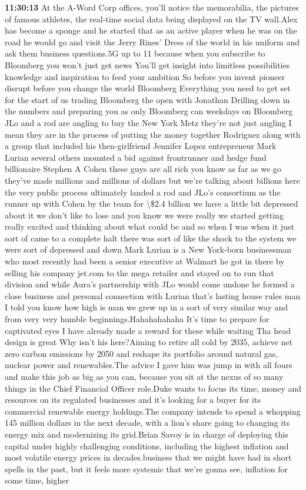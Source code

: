 \documentclass{article}%
\begin{document}
\textbf{11:30:13}%
\newline%
At the A{-}Word Corp offices, you'll notice the memorabilia, the pictures of famous athletes, the real{-}time social data being displayed on the TV wall.Alex has become a sponge and he started that as an active player when he was on the road he would go and visit the Jerry Rines' Dress of the world in his uniform and ask them business questions.5G up to 11 because when you subscribe to Bloomberg you won't just get news You'll get insight into limitless possibilities knowledge and inspiration to feed your ambition So before you invent pioneer disrupt before you change the world Bloomberg Everything you need to get set for the start of us trading Bloomberg the open with Jonathan Drilling down in the numbers and preparing you as only Bloomberg can weekdays on Bloomberg JLo and a rod are angling to buy the New York Metz they're not just angling I mean they are in the process of putting the money together Rodriguez along with a group that included his then{-}girlfriend Jennifer Lopez entrepreneur Mark Lurian several others mounted a bid against frontrunner and hedge fund billionaire Stephen A Cohen these guys are all rich you know as far as we go they've made millions and millions of dollars but we're talking about billions here the very public process ultimately landed a rod and JLo's consortium as the runner up with Cohen by the team for \textbackslash{}\$2.4 billion we have a little bit depressed about it we don't like to lose and you know we were really we started getting really excited and thinking about what could be and so when I was when it just sort of came to a complete halt there was sort of like the shock to the system we were sort of depressed and down Mark Lurian is a New York{-}born businessman who most recently had been a senior executive at Walmart he got in there by selling his company jet.com to the mega retailer and stayed on to run that division and while Aura's partnership with JLo would come undone he formed a close business and personal connection with Lurian that's lasting house rules man I told you know how high is man we grew up in a sort of very similar way and from very very humble beginnings.Hahahahahaha It's time to prepare for captivated eyes I have already made a reward for these while waiting Tha head design is great Why isn't his here?Aiming to retire all cold by 2035, achieve net zero carbon emissions by 2050 and reshape its portfolio around natural gas, nuclear power and renewables.The advice I gave him was jump in with all fours and make this job as big as you can, because you sit at the nexus of so many things in the Chief Financial Officer role.Duke wants to focus its time, money and resources on its regulated businesses and it's looking for a buyer for its commercial renewable energy holdings.The company intends to spend a whopping 145 million dollars in the next decade, with a lion's share going to changing its energy mix and modernizing its grid.Brian Savoy is in charge of deploying this capital under highly challenging conditions, including the highest inflation and most volatile energy prices in decades.business that we might have had in short spells in the past, but it feels more systemic that we're gonna see, inflation for some time, higher 
\end{document}
